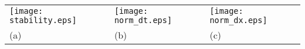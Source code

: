 \documentclass[10pt,a4paper]{article}
\begin{document}
  \begin{tabular}{l@{}l@{}l}
        \texttt{[image: stability.eps]}&    \texttt{[image: norm\_dt.eps]}
                                                                                                             &
                                                     \texttt{[image: norm\_dx.eps]}
    \\
    (a)&(b)&(c)
  \end{tabular}
\end{document}
